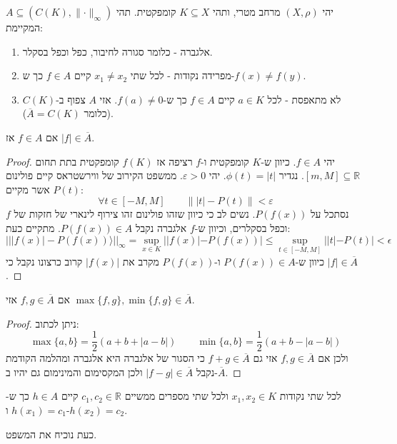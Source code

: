 \documentclass{tstextbook}
\begin{document}
\begin{theorem}
יהי \((X,\rho)\) מרחב מטרי, ותהי \(K\subseteq X\) קומפקטית. תהי \(A\subseteq(C(K),\lVert \cdot \rVert_{\infty})\) המקיימת:

  \begin{enumerate}
    \item אלגברה - כלומר סגורה לחיבור, כפל וכפל בסקלר. 


    \item מפרידה נקודות - לכל שתי \(x_{1}\neq x_{2}\) קיים \(f \in A\) כך ש-\(f(x)\neq f(y)\). 


    \item לא מתאפסת - לכל \(a \in K\) קיים \(f \in A\) כך ש-\(f(a)\neq 0\). 
אזי \(A\) צפוף ב-\(C(K)\)(כלומר \(\overline{A}=C(K)\)).


  \end{enumerate}
\end{theorem}
\begin{lemma}
אם \(f \in A\) אז \(\lvert f \rvert\in \overline{A}\).

\end{lemma}
\begin{proof}
יהי \(f \in A\). כיוון ש-\(K\) קומפקטית ו-\(f\) רציפה אז \(f(K)\) קומפקטית בתת תחום \([m,M]\subseteq \mathbb{R}\).
נגדיר \(\phi(t)=\lvert t \rvert\). יהי \(\varepsilon> 0\). ממשפט הקירוב של ווירשטראס קיים פולינום \(P(t)\) אשר מקיים:
$$\forall t \in [-M,M]\qquad \lVert \lvert t \rvert -P(t) \rVert <\varepsilon$$
נסתכל על \(P(f(x))\). נשים לב כי כיוון שזהו פולינום זהו צירוף לינארי של חזקות של \(f\) וכפל בסקלרים, וכיוון ש-\(f\) אלגברה נקבל \(P(f(x))\in A\). מתקיים כעת:
$$|||f(x)|-P(f(x))\rangle||_{\infty}=\operatorname*{sup}_{x\in K}||f(x)|-P(f(x))|\leq\operatorname*{sup}_{t\in[-M,M]}||t|-P(t)|<\epsilon$$
כיוון ש-\(P(f(x))\in A\) ו-\(P(f(x))\) מקרב את \(\lvert f(x) \rvert\) קרוב כרצונו נקבל כי \(\lvert f \rvert\in \overline{A}\).

\end{proof}
\begin{lemma}
אם \(f,g \in \overline{A}\) אזי \(\max\{ f,g \},\min\{ f,g \}\in \overline{A}\).

\end{lemma}
\begin{proof}
ניתן לכתוב:
$$\operatorname*{max}\{a,b\}={\frac{1}{2}}(a+b+|a-b|)\qquad \operatorname*{min}\{a,b\}={\frac{1}{2}}(a+b-|a-b|)$$
ולכן אם \(f,g \in \overline{A}\) אזי גם \(f+g \in \overline{A}\) כי הסגור של אלגברה היא אלגברה ומהלמה הקודמת נקבל \(\lvert f-g \rvert\in \overline{A}\) ולכן המקסימום והמינימום גם יהיו ב-\(\overline{A}\).

\end{proof}
\begin{lemma}
לכל שתי נקודות \(x_{1},x_{2} \in K\) ולכל שתי מספרים ממשיים \(c_{1},c_{2} \in \mathbb{R}\) קיים \(h \in A\) כך ש-\(h(x_{1})=c_{1}\) ו-\(h(x_{2})=c_{2}\).

\end{lemma}
כעת נוכיח את המשפט.
\end{document}
